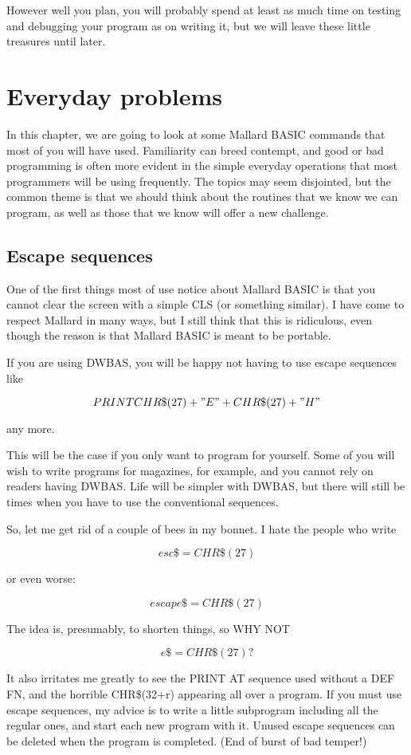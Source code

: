 \documentclass[]{report} %
\begin{document}
However  well  you  plan, you will probably spend at least  as  much  time  on 
testing  and debugging your program as on writing it, but we will leave  these 
little treasures until later.

\chapter{Everyday problems}
In this chapter, we are going to look at some Mallard BASIC commands that most 
of  you  will  have  used. Familiarity can breed contempt,  and  good  or  bad 
programming is often more evident in the simple everyday operations that  most 
programmers will be using frequently. The topics may seem disjointed, but  the 
common  theme is that we should think about the routines that we know  we  can 
program, as well as those that we know will offer a new challenge.

\section{Escape sequences}
One  of  the first things most of use notice about Mallard BASIC is  that  you 
cannot clear the screen with a simple CLS (or something similar). I have  come 
to  respect Mallard in many ways, but I still think that this  is  ridiculous, 
even though the reason is that Mallard BASIC is meant to be portable.

If  you are using DWBAS, you will be happy not having to use escape  sequences 
like

        $$PRINT CHR\$ (27) + "E" + CHR\$ (27) + "H"$$

any more.

This  will be the case if you only want to program for yourself. Some  of  you 
will wish to write programs for magazines, for example, and you cannot rely on 
readers having DWBAS. Life will be simpler with DWBAS, but there will still be 
times when you have to use the conventional sequences.

So,  let  me get rid of a couple of bees in my bonnet. I hate the  people  who 
write

        $$esc\$ = CHR\$ (27)$$

or even worse:

        $$escape\$ = CHR\$ (27)$$

The idea is, presumably, to shorten things, so WHY NOT

        $$e\$ = CHR\$ (27) ?$$

It  also irritates me greatly to see the PRINT AT sequence used without a  DEF 
FN, and the horrible CHR\$(32+r) appearing all over a program. If you must  use 
escape sequences, my advice is to write a little subprogram including all  the 
regular ones, and start each new program with it. Unused escape sequences  can 
be deleted when the program is completed. (End of burst of bad temper!)
\end{document}
